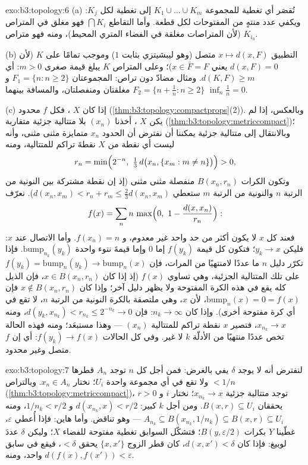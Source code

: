 \begin{solution}{exo:b3:topology:6}
(a) تُقصَر أي تغطية للمجموعة $K_1 \cup \dots \cup K_m$ إلى تغطية لكل $K_j$: ويكفي
عدد منتهٍ من المفتوحات لكل قطعة. وأما التقاطع $\bigcap K_i$
فهو مغلق في المتراص $K_{i_0}$ (لأن المتراصات مغلقة في الفضاء
المتري المحيط)، ومنه فهو متراص.

(b) التطبيق $x \mapsto d(x, F)$ متصل (وهو ليبشيتزي بثابت $1$) وموجب تمامًا
على $K$ (لأن $d(x, F) = 0$ يعني $x \in \bar F =
F$)؛ وعلى المتراص $K$ يبلغ
قيمة صغرى $m > 0$: أي $d(K, F)
\geq m$. ومثال مضادّ دون تراص: المجموعتان
$F_1 = \{n : n \geq
2\}$ و $F_2 = \{n + \frac1n : n \geq 2\}$ مغلقتان ومنفصلتان، والمسافة بينهما $\inf_n \frac1n = 0$.

(c) إذا كان $X$ ، فكل  $f$ محدود
(\cref{thm:b3:topology:compactprops}(2)). وبالعكس، إذا لم يكن $X$ ، أخذنا
$(x_n)$ بلا متتالية جزئية متقاربة (\cref{thm:b3:topology:metriccompact})؛ وبالانتقال إلى
متتالية جزئية يمكننا أن نفترض أن الحدود $x_n$ متمايزة مثنى
مثنى، وأنه ليست أي نقطة من $X$ نقطةَ تراكم للمتتالية، ومنه
\[
r_n = \min\Bigl(2^{-n},\ \tfrac13\,d\bigl(x_n, \{x_m : m \neq
n\}\bigr)\Bigr) > 0,
\]
وتكون الكرات $B(x_n, r_n)$ منفصلة مثنى مثنى (إذ إن نقطة مشتركة
بين النونية من الرتبة $n$ والنونية من الرتبة $m$ ستعطي $d(x_n, x_m) < r_n +
r_m \leq \frac23 d(x_n, x_m)$).
نعرّف
\[
f(x) = \sum_{n} n\,\max\Bigl(0,\ 1 - \frac{d(x,
x_n)}{r_n}\Bigr):
\]
فعند كل $x$ لا يكون أكثر من حد واحد غير معدوم، و $f(x_n) = n$.
وأما الاتصال عند $x$: فليكن $y_k \to x$؛ فتكون كل قيمة $f(y_k)$
إما $0$ وإما قيمةَ نتوء واحدة $\mathrm{bump}_{n_k}(y_k)$. فإذا تكرّر دليل $n$ ما
عددًا لامنتهيًا من المرات، فإن $f(y_k) = \mathrm{bump}_n(y_k) \to
\mathrm{bump}_n(x)$ على تلك المتتالية
الجزئية، وهي تساوي $f(x)$ (إذ إذا كان $x \in B(x_n,
r_n)$، فإن الذيل كله
يقع في هذه الكرة المفتوحة ولا يظهر دليل آخر؛ وإذا كان $x \notin B(x_n, r_n)$
فإن $\mathrm{bump}_n(x) = 0 = f(x)$، لأن $x$، وهي ملتصقة بالكرة النونية من الرتبة $n$،
لا تقع في أي كرة مفتوحة أخرى). وإذا كان $n_k \to \infty$:
فإن $d(y_k, x_{n_k}) < r_{n_k} \leq 2^{-n_k} \to 0$، ومنه $x_{n_k}
\to x$، فتصير $x$ نقطة تراكم للمتتالية
$(x_n)$ --- وهذا مستبعَد؛ ومنه فهذه الحالة تخص عددًا منتهيًا من
الأدلّة $k$ لا غير. وفي كل الحالات $f(y_k) \to f(x)$: أي إن $f$ متصل وغير
محدود.
\end{solution}

\begin{solution}{exo:b3:topology:7}
لنفترض أنه لا يوجد $\delta$ يفي بالغرض: فمن أجل كل $n$ توجد
$A_n$ قطرها $< 1/n$ ولا تقع في أي مجموعة واحدة $U_i$؛ نختار
$x_n \in
A_n$. وبالتراص (\cref{thm:b3:topology:metriccompact})، توجد متتالية جزئية
$x_{n_k} \to x$؛ نختار $i$ و $r > 0$ يحققان $B(x,
r) \subseteq U_i$. ومن أجل
$k$ كبير: $d(x_{n_k}, x) < r/2$ و $1/n_k < r/2$، ومنه $A_{n_k} \subseteq B(x_{n_k}, 1/n_k)
\subseteq B(x, r) \subseteq U_i$ --- وهو تناقض.
وأما هاين: فإذا أُعطي $\varepsilon$، غطّينا $Y$ بكرات $B(y, \varepsilon/2)$؛
فتشكّل السوابق تغطية مفتوحة للفضاء $X$؛ وليكن $\delta$ عددَ
لوبيغ: فإذا كان $d(x, x') < \delta$، كان قطر الزوج $\{x, x'\}$ يحقق $< \delta$، فيقع في سابق واحد، ومنه $d(f(x),
f(x')) < \varepsilon$.
\end{solution}

